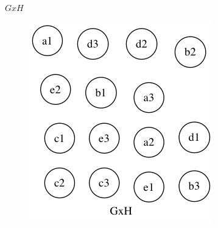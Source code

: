 \begin{enumerate}[(a)]
\begin{figure}[H]
    \end{figure}
    $GxH$
    \begin{figure}[H]
    \centering
    \includegraphics[scale=0.5]{115/115bGH2.png}
    \end{figure}


\end{enumerate}
